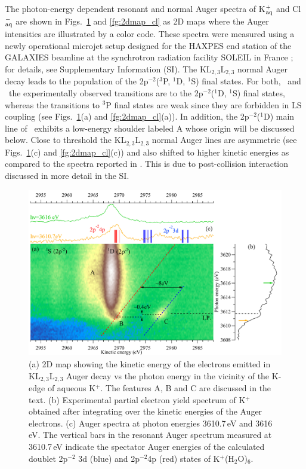 {\color{blue}
The photon-energy dependent resonant and normal Auger spectra of K$^+_{\rm aq}$ and Cl$^-_{\rm aq}$ are shown in Figs.\ \ref{fg:2dmap_k} and \ref{fg:2dmap_cl} as 2D maps where the Auger intensities are illustrated by a color code. These spectra were measured using a newly operational microjet setup designed for the HAXPES end station of the GALAXIES beamline at the synchrotron radiation facility SOLEIL in France \citep{ceolin13:188,rueff15:175}; for details, see Supplementary Information (SI). The KL$_{2,3}$L$_{2,3}$ normal Auger decay leads to the population of the 2p$^{-2}$($^3$P, $^1$D, $^1$S) final states. For both, \ki~and \cli~the experimentally observed transitions are to the 2p$^{-2}$($^1$D, $^1$S) final states, whereas the transitions to $^3$P final states are weak since they are forbidden in LS coupling (see Figs.\ \ref{fg:2dmap_k}(a) and  \ref{fg:2dmap_cl}(a)). In addition, the 2p$^{-2}$($^1$D) main line of \ki~exhibits a low-energy shoulder labeled A whose origin will be discussed below.} Close to threshold the KL$_{2,3}$L$_{2,3}$ normal Auger lines are asymmetric (see Figs.\ \ref{fg:2dmap_k}(c) and \ref{fg:2dmap_cl}(c)) and also shifted to higher kinetic energies as compared to the spectra reported in \citep{ceolin17:263003}. This is due to post-collision interaction \citep{russek86:911,guillemin15:012503} discussed in more detail in the SI.


\begin{figure}[h!]
\centering
\includegraphics[scale=0.55]{figures/k_2dmap.pdf}
\caption{(a) 2D map showing the kinetic energy of the electrons emitted in KL$_{2,3}$L$_{2,3}$ Auger decay vs the photon energy in the vicinity of the K-edge of aqueous K$^{+}$. The features A, B and C are discussed in the text.
(b) Experimental partial electron yield spectrum of K$^{+}$ obtained after integrating over the kinetic energies of the Auger electrons.
(c) Auger spectra at photon energies 3610.7\,eV and 3616\,eV. The vertical bars in the resonant Auger spectrum measured at 3610.7\,eV indicate the spectator Auger energies of the calculated doublet 2p$^{-2}$ 3d (blue) and 2p$^{-2}$4p (red) states of K$^{+}$(H$_2$O)$_6$.}
\label{fg:2dmap_k}
\end{figure}


